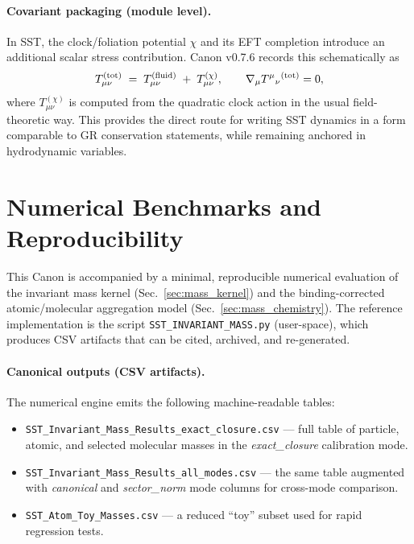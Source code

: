 \documentclass[10pt]{article}
\begin{document}
\paragraph{Covariant packaging (module level).}
In SST, the clock/foliation potential $\chi$ and its EFT completion introduce an
additional scalar stress contribution. Canon v0.7.6 records this schematically as
\begin{equation}
    T_{\mu\nu}^{\rm (tot)} \;=\; T_{\mu\nu}^{\rm (fluid)} \;+\; T_{\mu\nu}^{(\chi)},
    \qquad
    \nabla_\mu T^{\mu}{}_{\nu}{}^{\rm (tot)}=0,
\end{equation}
where $T_{\mu\nu}^{(\chi)}$ is computed from the quadratic clock action in the usual
field-theoretic way. This provides the direct route for writing SST dynamics in a
form comparable to GR conservation statements, while remaining anchored in
hydrodynamic variables.


\section{Numerical Benchmarks and Reproducibility}
\label{app:benchmarks}

This Canon is accompanied by a minimal, reproducible numerical evaluation of the invariant mass kernel (Sec.~\ref{sec:mass_kernel}) and the binding-corrected atomic/molecular aggregation model (Sec.~\ref{sec:mass_chemistry}). The reference implementation is the script \texttt{SST\_INVARIANT\_MASS.py} (user-space), which produces CSV artifacts that can be cited, archived, and re-generated.

\paragraph{Canonical outputs (CSV artifacts).}
The numerical engine emits the following machine-readable tables:
\begin{itemize}
    \item \texttt{SST\_Invariant\_Mass\_Results\_exact\_closure.csv} --- full table of particle, atomic, and selected molecular masses in the \emph{exact\_closure} calibration mode.
    \item \texttt{SST\_Invariant\_Mass\_Results\_all\_modes.csv} --- the same table augmented with \emph{canonical} and \emph{sector\_norm} mode columns for cross-mode comparison.
    \item \texttt{SST\_Atom\_Toy\_Masses.csv} --- a reduced ``toy'' subset used for rapid regression tests.
\end{itemize}
\end{document}
